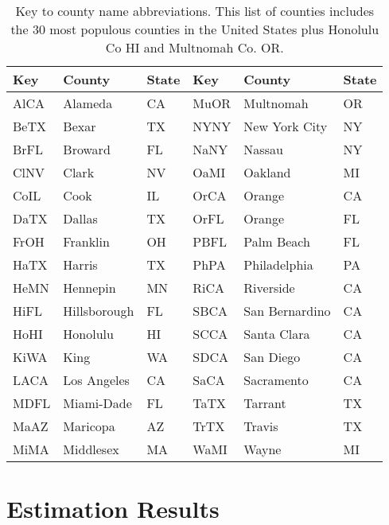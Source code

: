 \documentclass[12pt,letterpaper]{article}
\begin{document}
{\begin{appendices}
\begin{table}[!ht]
\caption{\label{tab:namekey}
Key to county name abbreviations. This list of counties includes the
30 most populous counties in the United States plus Honolulu Co HI and
Multnomah Co. OR.
}
\centering
\begin{tabular}{lll||lll}
\hline
Key&County&State&Key&County&State\\
\hline
AlCA&Alameda&CA&MuOR&Multnomah&OR\\
BeTX&Bexar&TX&NYNY&New York City&NY\\
BrFL&Broward&FL&NaNY&Nassau&NY\\
ClNV&Clark&NV&OaMI&Oakland&MI\\
CoIL&Cook&IL&OrCA&Orange&CA\\
DaTX&Dallas&TX&OrFL&Orange&FL\\
FrOH&Franklin&OH&PBFL&Palm Beach&FL\\
HaTX&Harris&TX&PhPA&Philadelphia&PA\\
HeMN&Hennepin&MN&RiCA&Riverside&CA\\
HiFL&Hillsborough&FL&SBCA&San Bernardino&CA\\
HoHI&Honolulu&HI&SCCA&Santa Clara&CA\\
KiWA&King&WA&SDCA&San Diego&CA\\
LACA&Los Angeles&CA&SaCA&Sacramento&CA\\
MDFL&Miami-Dade&FL&TaTX&Tarrant&TX\\
MaAZ&Maricopa&AZ&TrTX&Travis&TX\\
MiMA&Middlesex&MA&WaMI&Wayne&MI\\
\hline
\end{tabular}

\end{table}
\clearpage

\section{Estimation Results}


\end{appendices}}
\end{document}
